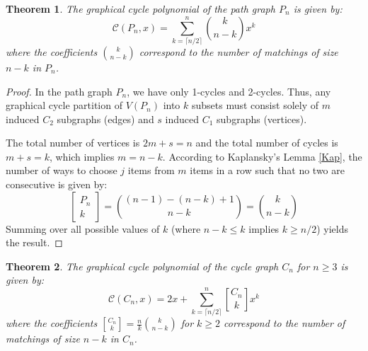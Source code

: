 \documentclass{amsart}
\newtheorem{theorem}{Theorem}[section]
\theoremstyle{definition}
\newcommand{\stirlgraph}[2]{\genfrac{[}{]}{0pt}{}{#1}{#2}}
\def\st#1#2{\begin{bmatrix} #1 \\ #2 \end{bmatrix}}
\begin{document}
\begin{theorem}\label{Pn}
The graphical cycle polynomial of the path graph $P_n$ is given by:
\begin{equation*}
    \mathcal{C}(P_n, x) = \sum_{k=\lceil n/2 \rceil}^{n} \binom{k}{n-k} x^k
\end{equation*}
where the coefficients $\binom{k}{n-k}$ correspond to the number of matchings of size $n-k$ in $P_n$.
\end{theorem}

\begin{proof}
In the path graph $P_n$, we have only 1-cycles and 2-cycles.  Thus, any graphical cycle partition of $V(P_n)$ into $k$ subsets must consist solely of $m$ induced $C_2$ subgraphs (edges) and $s$ induced $C_1$ subgraphs (vertices). 

The total number of vertices is $2m + s = n$ and the total number of cycles is $m + s = k$, which implies $m = n-k$. According to Kaplansky's Lemma \ref{Kap}, the number of ways to choose $j$ items from $m$ items in a row such that no two are consecutive is given by:
\begin{equation*}
    \st{P_n}{k} = \binom{(n-1) - (n-k) + 1}{n-k} = \binom{k}{n-k}
\end{equation*}
Summing over all possible values of $k$ (where $n-k \leq k$ implies $k \geq n/2$) yields the result.
\end{proof}



\begin{theorem}\label{Cn}
The graphical cycle polynomial of the cycle graph $C_n$ for $n \geq 3$ is given by:
\begin{equation*}
    \mathcal{C}(C_n, x) = 2x + \sum_{k=\lceil n/2 \rceil}^{n} \stirlgraph{C_n}{k} x^k
\end{equation*}
where the coefficients $\stirlgraph{C_n}{k} = \frac{n}{k} \binom{k}{n-k}$ for $k \geq 2$ correspond to the number of matchings of size $n-k$ in $C_n$.
\end{theorem}
\end{document}
